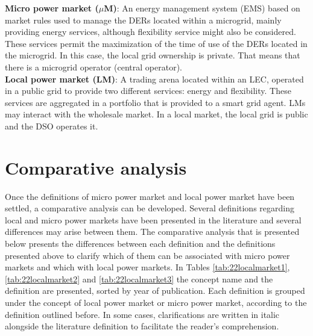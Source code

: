 
\begin{tcolorbox}
\textbf{Micro power market ($\mu$M)}: An energy management system (EMS) based on market rules used to
manage the DERs located within a microgrid, mainly providing energy services, although flexibility service
might also be considered. These services permit the maximization of the time of use of the DERs located in
the microgrid. In this case, the local grid ownership is private. That means that there is a microgrid operator
(central operator).\\
\newline
\textbf{Local power market (LM)}: A trading arena located within an LEC, operated in a public grid to provide
two different services: energy and flexibility. These services are aggregated in a portfolio that is provided to
a smart grid agent. LMs may interact with the wholesale market.
In a local market, the local grid is public and the DSO operates it.
\end{tcolorbox}

\section{Comparative analysis} \label{sec:comparative}
Once the definitions of micro power market and local power market have been settled, a comparative analysis can be developed. Several definitions regarding local and micro power markets have been presented in the literature and several differences may arise between them. The comparative analysis that is presented below presents the differences between each definition and the definitions presented above to clarify which of them can be associated with micro power markets and which with local power markets. In Tables \ref{tab:22localmarket1}, \ref{tab:22localmarket2} and \ref{tab:22localmarket3} the concept name and the definition are presented, sorted by year of publication. Each definition is grouped under the concept of local power market or micro power market, according to the definition outlined before. In some cases, clarifications are written in italic alongside the literature definition to facilitate the reader's comprehension.

